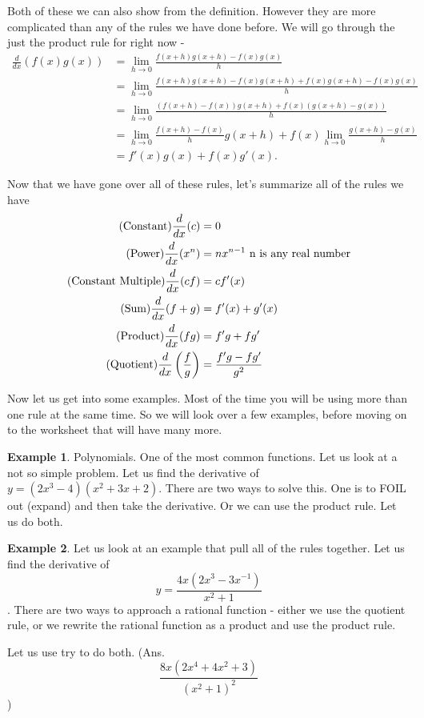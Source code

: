 \documentclass[12pt,reqno]{article}
\theoremstyle{definition}
\newtheorem*{Example}{Example}
\begin{document}
Both of these we can also show from the definition. However they are more complicated than any of the rules we have done before. We will go through the just the product rule for right now - 
\begin{align*}
	\frac{d}{dx}(f(x) g(x)) &= \lim_{h \to 0} \frac{f(x + h)g(x + h) - f(x) g(x)} {h} \\
						    &= \lim_{h \to 0} \frac{f(x + h) g(x + h) - f(x) g(x + h) + f(x)g(x + h) - f(x) g(x)}{h} \\
					    	&= \lim_{h \to 0} \frac{(f(x + h) - f(x)) g(x + h) + f(x) (g(x + h) - g(x))}{h} \\
					    	&= \lim_{h \to 0} \frac{f(x + h) - f(x)}{h} g(x + h) + f(x) \lim_{h \to 0} \frac{g(x + h) - g(x)}{h} \\ 
					    	&= f'(x) g(x) + f(x) g'(x).  
\end{align*}


Now that we have gone over all of these rules, let's summarize all of the rules we have 
\begin{align}
	\textnormal{(Constant)} \frac{d}{dx} (c) &= 0 \\ 
	\textnormal{(Power)} \frac{d}{dx} (x^n) &= n x^{n - 1} \textnormal{ n is any real number} \\
	\textnormal{(Constant Multiple)} \frac{d}{dx}(c f) &= c f'(x) \\ 
	\textnormal{(Sum)} \frac{d}{dx}(f  + g) &= f'(x) + g'(x) \\
	\textnormal{(Product)} \frac{d}{dx} (f g) &= f' g + f g' \\
	\textnormal{(Quotient)} \frac{d}{dx} \left(\frac{f}{g}\right) &= \frac{f' g - f g'}{g^2} 
\end{align}


Now let us get into some examples. Most of the time you will be using more than one rule at the same time. So we will look over a few examples, before moving on to the worksheet that will have many more. 

\begin{Example}
	Polynomials. One of the most common functions. Let us look at a not so simple problem. Let us find the derivative of $y = (2x^3 - 4)(x^2 +3x + 2)$. There are two ways to solve this. One is to FOIL out (expand) and then take the derivative. Or we can use the product rule. Let us do both. 
\end{Example}

\begin{Example}
	Let us look at an example that pull all of the rules together. Let us find the derivative of $$y = \frac{4x(2x^3 - 3x^{-1})}{x^2 + 1}$$. There are two ways to approach a rational function - either we use the quotient rule, or we rewrite the rational function as a product and use the product rule. 
	
	Let us use try to do both. (Ans. $$\frac{8x(2x^4 + 4x^2 + 3)}{(x^2 + 1)^2}$$)
\end{Example}
\end{document}
